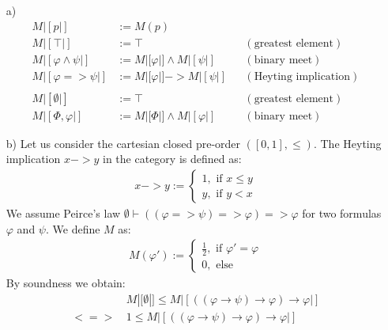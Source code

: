 \begin{answer}
    \begin{itemize}
        \item[a)]
            \begin{align*}
                M|[p|] & := M(p)\\
                M|[\top|] & := \top && (\text{greatest element})\\
                M|[\varphi \land \psi|] & := M|[\varphi|] \land M|[\psi|] && (\text{binary meet})\\
                M|[\varphi => \psi|] & := M|[\varphi|] -> M|[\psi|] && (\text{Heyting implication})\\
                \\
                M|[\emptyset|] & := \top && (\text{greatest element})\\
                M|[\Phi, \varphi|] & := M|[\Phi|] \land M|[\varphi|] && (\text{binary meet})
            \end{align*}
        \item[b)] Let us consider the cartesian closed pre-order $([0,1], \le)$.
            The Heyting implication $x -> y$ in the category is defined as:
            \begin{align*}
                x -> y := \begin{cases}
                    1, \text{ if } x \le y\\
                    y, \text{ if } y < x
                       \end{cases}
            \end{align*}
            We assume Peirce's law $\emptyset \vdash ((\varphi => \psi) => \varphi) => \varphi$ for two formulas $\varphi$ and $\psi$.
            We define $M$ as:
            \begin{align*}
                M(\varphi') := \begin{cases}
                        \frac{1}{2}, \text{ if } \varphi' = \varphi\\
                        0, \text{ else}
                    \end{cases}
            \end{align*}
            By soundness we obtain:
            \begin{align*}
                      & M|[\emptyset|] \le M|[((\varphi \to \psi) \to \varphi) \to \varphi|] \\
                <=>\, & 1 \le M|[((\varphi \to \psi) \to \varphi) \to \varphi|] \\

\end{align*}
\end{itemize}
\end{answer}
